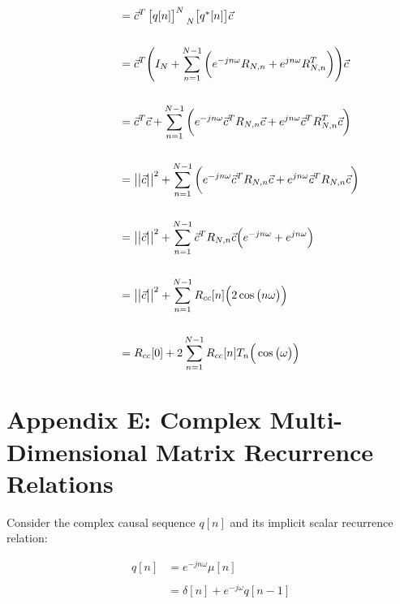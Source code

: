 \documentclass{article}
\begin{document}
\begin{align*}
    &\quad \quad \quad \quad \quad = \vec{c}^{T}\begin{bmatrix} q[n] \end{bmatrix}^{N}\prescript{}{N}{\begin{bmatrix} q^{*}[n] \end{bmatrix}}\vec{c} \\ \\
    &\quad \quad \quad \quad \quad = \vec{c}^{T}\Bigg(I_{N} + \sum_{n = 1}^{N - 1}\bigg( e^{-jn\omega}R_{N, n} + e^{ jn\omega}R_{N, n}^{T} \bigg)\Bigg)\vec{c} \\ \\
    &\quad \quad \quad \quad \quad = \vec{c}^{T}\vec{c} + \sum_{n = 1}^{N - 1}\bigg( e^{-jn\omega}\vec{c}^{T}R_{N, n}\vec{c} + e^{ jn\omega}\vec{c}^{T}R_{N, n}^{T}\vec{c} \bigg) \\ \\
    &\quad \quad \quad \quad \quad = \big|\big|\vec{c}\big|\big|^{2} + \sum_{n = 1}^{N - 1}\bigg( e^{-jn\omega}\vec{c}^{T}R_{N, n}\vec{c} + e^{ jn\omega}\vec{c}^{T}R_{N, n}\vec{c} \bigg) \\ \\
    &\quad \quad \quad \quad \quad = \big|\big|\vec{c}\big|\big|^{2} + \sum_{n = 1}^{N - 1}\vec{c}^{T}R_{N, n}\vec{c}\Big( e^{-jn\omega} + e^{ jn\omega} \Big) \\ \\
    &\quad \quad \quad \quad \quad = \big|\big|\vec{c}\big|\big|^{2} + \sum_{n = 1}^{N - 1}R_{cc}[n]\Big( 2\cos\big(n\omega\big) \Big) \\ \\
    &\quad \quad \quad \quad \quad = R_{cc}[0] + 2\sum_{n = 1}^{N - 1}R_{cc}[n]T_{n}\Big(\cos\big(\omega\big)\Big)
  \end{align*}

\newpage
\section*{Appendix E: Complex Multi-Dimensional Matrix Recurrence Relations}

Consider the complex causal sequence $q[n]$ and its implicit scalar recurrence relation:

\begin{align*}
    q[n]&= e^{-jn\omega}\mu[n] \\ \\
        &= \delta[n] + e^{-j\omega}q[n - 1]
  \end{align*}\newline
\end{document}
